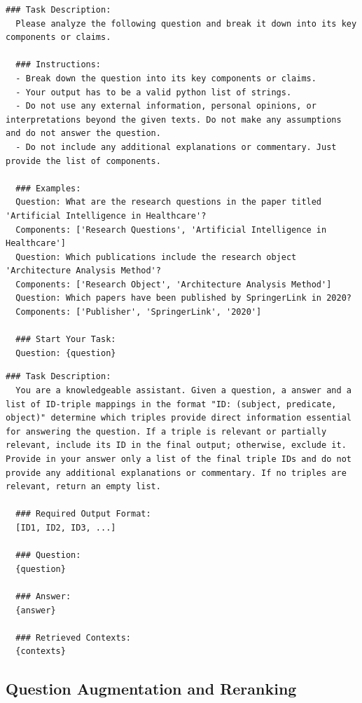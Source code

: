 \begin{lstlisting}[caption={Question Component Extraction Prompt}]
  ### Task Description:
  Please analyze the following question and break it down into its key components or claims. 

  ### Instructions:
  - Break down the question into its key components or claims.
  - Your output has to be a valid python list of strings.
  - Do not use any external information, personal opinions, or interpretations beyond the given texts. Do not make any assumptions and do not answer the question.
  - Do not include any additional explanations or commentary. Just provide the list of components.

  ### Examples:
  Question: What are the research questions in the paper titled 'Artificial Intelligence in Healthcare'?
  Components: ['Research Questions', 'Artificial Intelligence in Healthcare']
  Question: Which publications include the research object 'Architecture Analysis Method'?
  Components: ['Research Object', 'Architecture Analysis Method']
  Question: Which papers have been published by SpringerLink in 2020?
  Components: ['Publisher', 'SpringerLink', '2020']

  ### Start Your Task:
  Question: {question}
\end{lstlisting}

\begin{lstlisting}[caption={Triple Filtering Prompt}]
  ### Task Description:
  You are a knowledgeable assistant. Given a question, a answer and a list of ID-triple mappings in the format "ID: (subject, predicate, object)" determine which triples provide direct information essential for answering the question. If a triple is relevant or partially relevant, include its ID in the final output; otherwise, exclude it. Provide in your answer only a list of the final triple IDs and do not provide any additional explanations or commentary. If no triples are relevant, return an empty list.

  ### Required Output Format:
  [ID1, ID2, ID3, ...]

  ### Question:
  {question}

  ### Answer:
  {answer}

  ### Retrieved Contexts:
  {contexts}
\end{lstlisting}



\subsection{Question Augmentation and Reranking}

